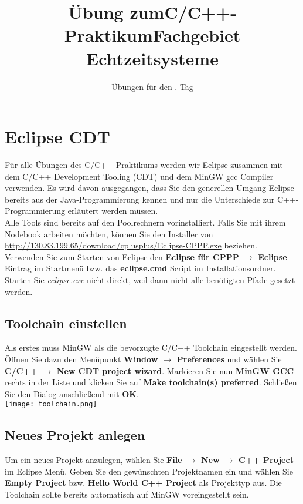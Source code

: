 \documentclass[
  accentcolor=tud1c,	%
  colorbacktitle,		%
  inverttitle,			%
  german,				%
  twoside
]{tudexercise}
\title{Übung zum\linebreak[1]C/C++-Praktikum\linebreak[1] Fachgebiet Echtzeitsysteme}
\subtitle{Übungen für den \tag{}. Tag}
\newcommand{\tag}{1}
\begin{document}
\begin{examheader}
	\textmb{Übung zum C/C++-Praktikum - Tag \tag{}}
\end{examheader}
\maketitle 

\vspace{5mm}

\section{Eclipse CDT}

Für alle Übungen des C/C++ Praktikums werden wir Eclipse zusammen mit dem C/C++ Development Tooling (CDT) und dem MinGW gcc Compiler verwenden. Es wird davon ausgegangen, dass Sie den generellen Umgang Eclipse bereits aus der Java-Programmierung kennen und nur die Unterschiede zur C++-Programmierung erläutert werden müssen. \\ 

Alle Tools sind bereits auf den Poolrechnern vorinstalliert. Falls Sie mit ihrem Nodebook arbeiten möchten, können Sie den Installer von \href{http://130.83.199.65/download/cplusplus/Eclipse-CPPP.exe}{http://130.83.199.65/download/cplusplus/Eclipse-CPPP.exe} beziehen.\\

Verwenden Sie zum Starten von Eclipse den \textbf{Eclipse für CPPP $\rightarrow$ Eclipse} Eintrag im Startmenü bzw. das \textbf{eclipse.cmd} Script im Installationsordner. Starten Sie \emph{eclipse.exe} nicht direkt, weil dann nicht alle benötigten Pfade gesetzt werden. 

\subsection{Toolchain einstellen}

Als erstes muss MinGW als die bevorzugte C/C++ Toolchain eingestellt werden. Öffnen Sie dazu den Menüpunkt \textbf{Window $\rightarrow$   Preferences} und wählen Sie \textbf{C/C++ $\rightarrow$  New CDT project wizard}. Markieren Sie nun \textbf{MinGW GCC} rechts in der Liste und klicken Sie auf \textbf{Make toolchain(s) preferred}. Schließen Sie den Dialog anschließend mit \textbf{OK}.\\

\texttt{[image: toolchain.png]}

\subsection{Neues Projekt anlegen}
Um ein neues Projekt anzulegen, wählen Sie \textbf{File $\rightarrow$ New $\rightarrow$ C++ Project} im Eclipse Menü. Geben Sie den gewünschten Projektnamen ein und wählen Sie \textbf{Empty Project} bzw. \textbf{Hello World C++ Project} als Projekttyp aus. Die Toolchain sollte bereits automatisch auf MinGW voreingestellt sein.\\
\end{document}
